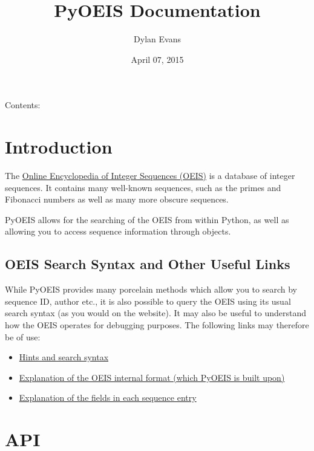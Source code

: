 \documentclass[letterpaper,10pt,english]{sphinxmanual}
\title{PyOEIS Documentation}
\date{April 07, 2015}
\author{Dylan Evans}
\begin{document}
\maketitle
\tableofcontents
{}\label{index::doc}


Contents:


\chapter{Introduction}
\label{introduction:introduction}\label{introduction::doc}\label{introduction:welcome-to-pyoeis-s-documentation}
The \href{http://www.oeis.org}{Online Encyclopedia of Integer Sequences (OEIS)} is
a database of integer sequences. It contains many well-known sequences, such as
the primes and Fibonacci numbers as well as many more obscure sequences.

PyOEIS allows for the searching of the OEIS from within Python, as well as
allowing you to access sequence information through
{\hyperref[api:sequence.Sequence]{\emph{}}} objects.


\section{OEIS Search Syntax and Other Useful Links}
\label{introduction:oeis-search-syntax-and-other-useful-links}
While PyOEIS provides many porcelain methods which allow you to search by
sequence ID, author etc., it is also possible to query the OEIS using its
usual search syntax (as you would on the website). It may also be useful to
understand how the OEIS operates for debugging purposes. The following links
may therefore be of use:
\begin{itemize}
\item {} 
\href{http://oeis.org/hints.html}{Hints and search syntax}

\item {} 
\href{http://oeis.org/eishelp1.html}{Explanation of the OEIS internal format (which PyOEIS is built upon)}

\item {} 
\href{http://oeis.org/eishelp2.html}{Explanation of the fields in each sequence entry}

\end{itemize}


\chapter{API}
\label{api:api}\label{api::doc}
\end{document}

